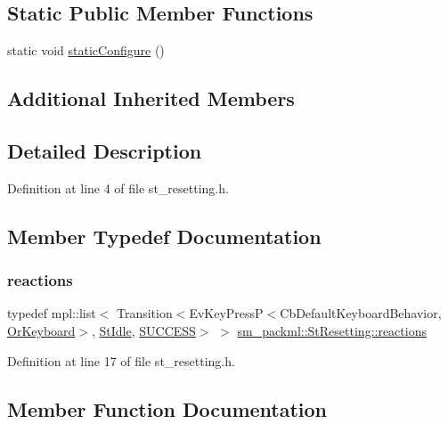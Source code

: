 \subsection*{Static Public Member Functions}
\begin{DoxyCompactItemize}
\item 
static void \hyperlink{structsm__packml_1_1StResetting_a03caab1a0b676ac2113e5e42fd235de3}{static\+Configure} ()
\end{DoxyCompactItemize}
\subsection*{Additional Inherited Members}


\subsection{Detailed Description}


Definition at line 4 of file st\+\_\+resetting.\+h.



\subsection{Member Typedef Documentation}
\mbox{\label{structsm__packml_1_1StResetting_a57233fed0eba5f99e5926f1363359a31}} 
\subsubsection{\texorpdfstring{reactions}{reactions}}
{\footnotesize\ttfamily typedef mpl\+::list$<$ Transition$<$Ev\+Key\+PressP$<$Cb\+Default\+Keyboard\+Behavior, \hyperlink{classsm__packml_1_1OrKeyboard}{Or\+Keyboard}$>$, \hyperlink{structsm__packml_1_1StIdle}{St\+Idle}, \hyperlink{classSUCCESS}{S\+U\+C\+C\+E\+SS}$>$ $>$ \hyperlink{structsm__packml_1_1StResetting_a57233fed0eba5f99e5926f1363359a31}{sm\+\_\+packml\+::\+St\+Resetting\+::reactions}}



Definition at line 17 of file st\+\_\+resetting.\+h.



\subsection{Member Function Documentation}
\mbox{\label{structsm__packml_1_1StResetting_a842772ce8ae203e4837d9b8bd0f8152b}} 
